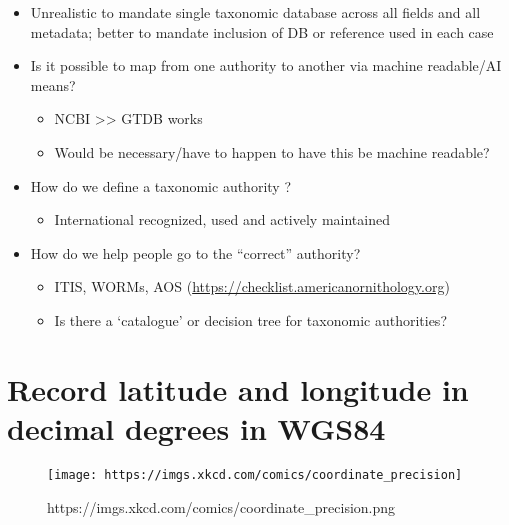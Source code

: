 \documentclass[
  oneside]{book}
\providecommand{\tightlist}{%
  \setlength{\itemsep}{0pt}\setlength{\parskip}{0pt}}
\begin{document}
\begin{itemize}
\tightlist
\item
  Unrealistic to mandate single taxonomic database across all fields and all metadata; better to mandate inclusion of DB or reference used in each case
\item
  Is it possible to map from one authority to another via machine readable/AI means?

  \begin{itemize}
  \tightlist
  \item
    NCBI \textgreater\textgreater{} GTDB works
  \item
    Would be necessary/have to happen to have this be machine readable?
  \end{itemize}
\item
  How do we define a taxonomic authority ?

  \begin{itemize}
  \tightlist
  \item
    International recognized, used and actively maintained
  \end{itemize}
\item
  How do we help people go to the ``correct'' authority?

  \begin{itemize}
  \tightlist
  \item
    ITIS, WORMs, AOS (\url{https://checklist.americanornithology.org})
  \item
    Is there a `catalogue' or decision tree for taxonomic authorities?
  \end{itemize}
\end{itemize}

\hypertarget{record-latitude-and-longitude-in-decimal-degrees-in-wgs84}{%
\section{Record latitude and longitude in decimal degrees in WGS84}\label{record-latitude-and-longitude-in-decimal-degrees-in-wgs84}}

\begin{figure}

{\centering \texttt{[image: https://imgs.xkcd.com/comics/coordinate\_precision]} 

}

\caption{https://imgs.xkcd.com/comics/coordinate_precision.png}\label{fig:xkcd2}
\end{figure}
\end{document}
